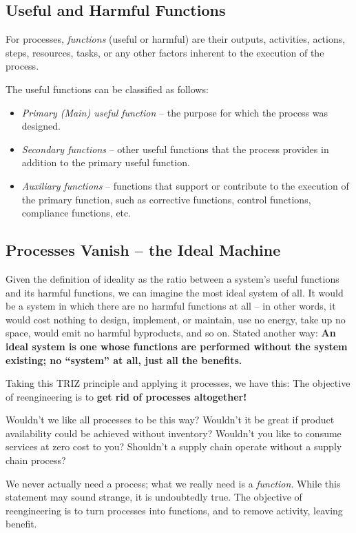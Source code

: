 \documentclass[11pt,a4paper]{article}
\begin{document}
\subsection{Useful and Harmful Functions}

For processes, \emph{functions} (useful or harmful) are their outputs,
activities, actions, steps, resources, tasks, or any other factors inherent to
the execution of the process.

The useful functions can be classified as follows:
\begin{itemize}
\item \emph{Primary (Main) useful function} – the purpose for which the
  process was designed.
\item \emph{Secondary functions} – other useful functions that the process
  provides in addition to the primary useful function.
\item \emph{Auxiliary functions} – functions that support or contribute to the
  execution of the primary function, such as corrective functions, control
  functions, compliance functions, etc.
\end{itemize}

\subsection{Processes Vanish -- the Ideal Machine}

Given the definition of ideality as the ratio between a system’s useful
functions and its harmful functions, we can imagine the most ideal system of
all. It would be a system in which there are no harmful functions at all – in
other words, it would cost nothing to design, implement, or maintain, use no
energy, take up no space, would emit no harmful byproducts, and so on. Stated
another way: \textbf{An ideal system is one whose functions are performed
  without the system existing; no “system” at all, just all the benefits.}

Taking this TRIZ principle and applying it processes, we have this: The
objective of reengineering is to \textbf{get rid of processes altogether!}

Wouldn’t we like all processes to be this way? Wouldn’t it be great if product
availability could be achieved without inventory? Wouldn’t you like to consume
services at zero cost to you? Shouldn’t a supply chain operate without a
supply chain process?

We never actually need a process; what we really need is a \emph{function}.
While this statement may sound strange, it is undoubtedly true. The objective
of reengineering is to turn processes into functions, and to remove activity,
leaving benefit.
\end{document}
